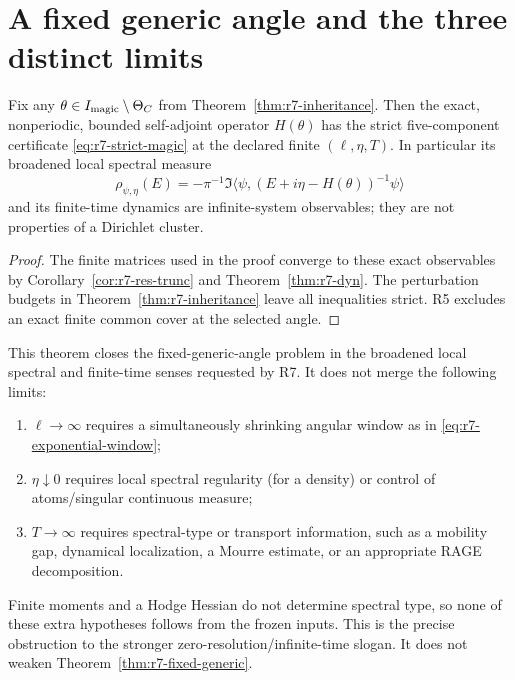 \section{A fixed generic angle and the three distinct limits}
\label{sec:r7-fixed-angle}

\begin{theorem}
\label{thm:r7-fixed-generic}
Fix any
$\theta\in I_{\rm magic}\setminus\Theta_C$ from
Theorem~\ref{thm:r7-inheritance}.  Then the exact, nonperiodic, bounded
self-adjoint operator $H(\theta)$ has the strict five-component certificate
\eqref{eq:r7-strict-magic} at the declared finite $(\ell,\eta,T)$.  In
particular its broadened local spectral measure
\begin{equation}
 \rho_{\psi,\eta}(E)=
 -\pi^{-1}\Im\langle\psi,(E+i\eta-H(\theta))^{-1}\psi\rangle
\end{equation}
and its finite-time dynamics are infinite-system observables; they are not
properties of a Dirichlet cluster.
\end{theorem}

\begin{proof}
The finite matrices used in the proof converge to these exact observables by
Corollary~\ref{cor:r7-res-trunc} and Theorem~\ref{thm:r7-dyn}.  The perturbation
budgets in Theorem~\ref{thm:r7-inheritance} leave all inequalities strict.
R5 excludes an exact finite common cover at the selected angle.
\end{proof}

This theorem closes the fixed-generic-angle problem in the broadened local
spectral and finite-time senses requested by R7.  It does not merge the
following limits:
\begin{enumerate}
\item $\ell\to\infty$ requires a simultaneously shrinking angular window as
in \eqref{eq:r7-exponential-window};
\item $\eta\downarrow0$ requires local spectral regularity (for a density) or
control of atoms/singular continuous measure;
\item $T\to\infty$ requires spectral-type or transport information, such as a
mobility gap, dynamical localization, a Mourre estimate, or an appropriate
RAGE decomposition.
\end{enumerate}
Finite moments and a Hodge Hessian do not determine spectral type, so none of
these extra hypotheses follows from the frozen inputs.  This is the precise
obstruction to the stronger zero-resolution/infinite-time slogan.  It does
not weaken Theorem~\ref{thm:r7-fixed-generic}.
